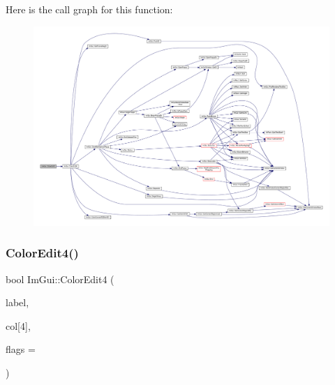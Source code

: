 Here is the call graph for this function\+:
\nopagebreak
\begin{figure}[H]
\begin{center}
\leavevmode
\includegraphics[width=350pt]{namespace_im_gui_a5afe76ba1c91f07363e40396e7df656e_cgraph}
\end{center}
\end{figure}
\mbox{\label{namespace_im_gui_ac3f45e2aa0b1d591cc8a2cdf8b566a45}} 
\subsubsection{\texorpdfstring{Color\+Edit4()}{ColorEdit4()}}
{\footnotesize\ttfamily bool Im\+Gui\+::\+Color\+Edit4 (\begin{DoxyParamCaption}\item[{const char $\ast$}]{label,  }\item[{float}]{col\mbox{[}4\mbox{]},  }\item[{\mbox{\hyperlink{imgui_8h_a6b2d5e95adc38f22c021252189f669c6}{Im\+Gui\+Color\+Edit\+Flags}}}]{flags = {} }\end{DoxyParamCaption})}

